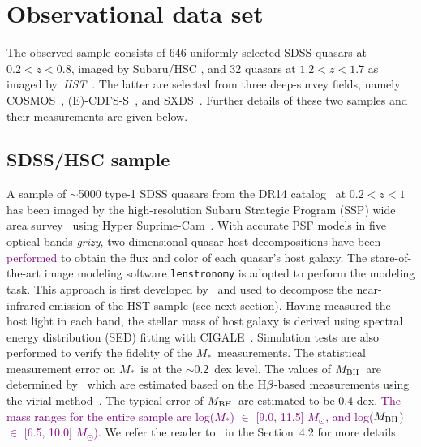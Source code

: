 \documentclass[twocolumn]{aastex631}
\newcommand{\red}[1]{\textcolor{purple}{#1}}
\def\smass{{$M_*$}}
\def\hbeta{${\rm H}\beta$}
\def\mbh{$M_{\rm BH}$}
\def\hst{{\it HST}}
\begin{document}
\section{Observational data set}
\label{sec:observations}
The observed sample consists of 646 uniformly-selected SDSS quasars at $0.2<z<0.8$, imaged by Subaru/HSC \citep{Li2021a}, and 32 quasars at $1.2<z<1.7$ as imaged by~\hst~\citep[][hereafter D20]{Ding2020}. The latter are selected from three deep-survey fields, namely COSMOS~\citep{Civano2016}, (E)-CDFS-S~\citep{Lehmer2005, Xue2011}, and SXDS~\citep{Ueda2008}. Further details of these two samples and their measurements are given below. 

\subsection{SDSS/HSC sample}\label{sec:hsc}
A sample of $\sim$5000 type-1 SDSS quasars from the DR14 catalog~\citep{Paris2018} at $0.2<z<1$ has been imaged by the high-resolution Subaru Strategic Program (SSP) wide area survey~\citep{Aihara2019} using Hyper Suprime-Cam~\citep{Miyazaki2018}. With accurate PSF models in five optical bands {\it grizy}, two-dimensional quasar-host decompositions have been \red{performed \citep[][]{Li2021a}} to obtain the flux and color of each quasar's host galaxy. The stare-of-the-art image modeling software {\tt lenstronomy} \citep{Birrer2015, Birrer2018, Birrer2021} is adopted to perform the modeling task. This approach is first developed by~\citet{Ding2020} and used to decompose the near-infrared emission of the HST sample (see next section). Having measured the host light in each band, the stellar mass of host galaxy is derived using spectral energy distribution (SED) fitting with CIGALE~\citep{Boquien2019}. Simulation tests are also performed to verify the fidelity of the \smass\ measurements. The statistical measurement error on \smass\ is at the $\sim$0.2~dex level. The values of \mbh\ are determined by~\citet{Rakshit2020} which are estimated based on the \hbeta-based measurements using the virial method~\citep{Peterson2004, Vestergaard2006}. The typical error of \mbh\ are estimated to be 0.4 dex. \red{The mass ranges for the entire sample are log(\smass) $\in$ [9.0, 11.5] $M_{\odot}$, and log(\mbh) $\in$  [6.5, 10.0] $M_{\odot}$)}.
 We refer the reader to~\citet{Li2021a} in the Section~4.2 for more details.
\end{document}
